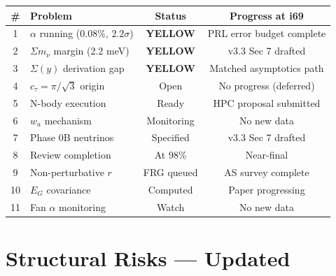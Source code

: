 \documentclass[11pt,a4paper]{article}
\newcommand{\YELLOW}{\textcolor{dfdyellow}{\textbf{YELLOW}}}
\begin{document}
\begin{center}
\begin{longtable}{clcc}
\toprule
\textbf{\#} & \textbf{Problem} & \textbf{Status} & \textbf{Progress at i69} \\
\midrule
1 & $\alpha$ running (0.08\%, $2.2\sigma$) & \YELLOW & PRL error budget complete \\
2 & $\Sigma m_\nu$ margin (2.2 meV) & \YELLOW & v3.3 Sec 7 drafted \\
3 & $\Sigma(y)$ derivation gap & \YELLOW & Matched asymptotics path \\
4 & $c_\tau = \pi/\sqrt{3}$ origin & Open & No progress (deferred) \\
5 & N-body execution & Ready & HPC proposal submitted \\
6 & $w_a$ mechanism & Monitoring & No new data \\
7 & Phase 0B neutrinos & Specified & v3.3 Sec 7 drafted \\
8 & Review completion & At 98\% & Near-final \\
9 & Non-perturbative $r$ & FRG queued & AS survey complete \\
10 & $E_G$ covariance & Computed & Paper progressing \\
11 & Fan $\alpha$ monitoring & Watch & No new data \\
\bottomrule
\end{longtable}
\end{center}


\section{Structural Risks --- Updated}
\end{document}

